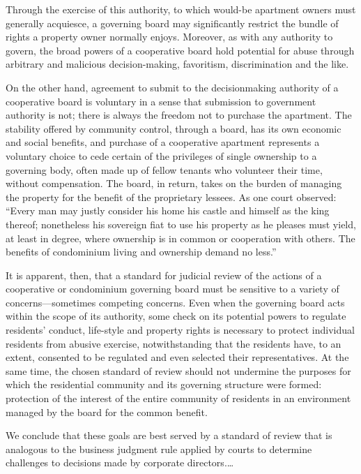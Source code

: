 Through the exercise of this authority, to which would-be apartment owners must
generally acquiesce, a governing board may significantly restrict the bundle of
rights a property owner normally enjoys. Moreover, as with any authority to
govern, the broad powers of a cooperative board hold potential for abuse through
arbitrary and malicious decision-making, favoritism, discrimination and the
like. 

On the other hand, agreement to submit to the decisionmaking authority of a
cooperative board is voluntary in a sense that submission to government
authority is not; there is always the freedom not to purchase the apartment. The
stability offered by community control, through a board, has its own economic
and social benefits, and purchase of a cooperative apartment represents a
voluntary choice to cede certain of the privileges of single ownership to a
governing body, often made up of fellow tenants who volunteer their time,
without compensation. The board, in return, takes on the burden of managing the
property for the benefit of the proprietary lessees. As one court observed:
``Every man may justly consider his home his castle and himself as the king
thereof; nonetheless his sovereign fiat to use his property as he pleases must
yield, at least in degree, where ownership is in common or cooperation with
others. The benefits of condominium living and ownership demand no less.'' 

It is apparent, then, that a standard for judicial review of the actions of a
cooperative or condominium governing board must be sensitive to a variety of
concerns---sometimes competing concerns. Even when the governing board acts
within the scope of its authority, some check on its potential powers to
regulate residents' conduct, life-style and property rights is necessary to
protect individual residents from abusive exercise, notwithstanding that the
residents have, to an extent, consented to be regulated and even selected their
representatives. At the same time, the chosen standard of review should not
undermine the purposes for which the residential community and its governing
structure were formed: protection of the interest of the entire community of
residents in an environment managed by the board for the common benefit. 

We conclude that these goals are best served by a standard of review that is
analogous to the business judgment rule applied by courts to determine
challenges to decisions made by corporate directors.\ldots 

